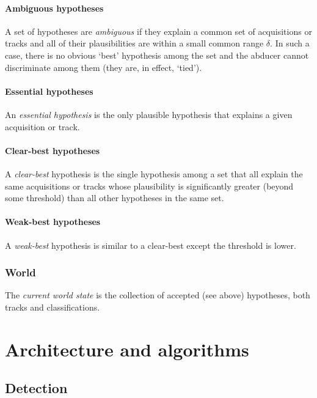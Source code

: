 \documentclass{book}
\begin{document}
\subsubsection{Ambiguous hypotheses}
\label{sec:ambiguous-hypotheses}

A set of hypotheses are \emph{ambiguous} if they explain a common set of
acquisitions or tracks and all of their plausibilities are within a small common
range $\delta$. In such a case, there is no obvious `best' hypothesis among the
set and the abducer cannot discriminate among them (they are, in effect,
`tied').

\subsubsection{Essential hypotheses}

An \emph{essential hypothesis} is the only plausible hypothesis that explains a
given acquisition or track.

\subsubsection{Clear-best hypotheses}

A \emph{clear-best} hypothesis is the single hypothesis among a set that all
explain the same acquisitions or tracks whose plausibility is significantly
greater (beyond some threshold) than all other hypotheses in the same set.

\subsubsection{Weak-best hypotheses}

A \emph{weak-best} hypothesis is similar to a clear-best except the threshold is
lower.

\subsection{World}
\label{sec:world}

The \emph{current world state} is the collection of accepted (see above)
hypotheses, both tracks and classifications.


\chapter{Architecture and algorithms}

\section{Detection}
\end{document}
